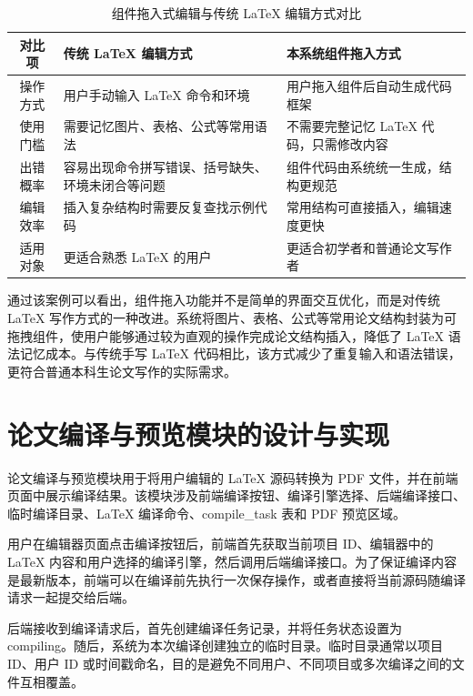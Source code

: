 \documentclass{xduugthesis}
\begin{document}
\begin{table}[!ht]
    \centering
    \caption{组件拖入式编辑与传统 LaTeX 编辑方式对比}
    \label{tab:drag-compare}
    \begin{tabular}{|c|p{5cm}|p{5cm}|}
        \hline
        对比项 & 传统 LaTeX 编辑方式 & 本系统组件拖入方式 \\
        \hline
        操作方式 & 用户手动输入 LaTeX 命令和环境 & 用户拖入组件后自动生成代码框架 \\
        \hline
        使用门槛 & 需要记忆图片、表格、公式等常用语法 & 不需要完整记忆 LaTeX 代码，只需修改内容 \\
        \hline
        出错概率 & 容易出现命令拼写错误、括号缺失、环境未闭合等问题 & 组件代码由系统统一生成，结构更规范 \\
        \hline
        编辑效率 & 插入复杂结构时需要反复查找示例代码 & 常用结构可直接插入，编辑速度更快 \\
        \hline
        适用对象 & 更适合熟悉 LaTeX 的用户 & 更适合初学者和普通论文写作者 \\
        \hline
    \end{tabular}
\end{table}

通过该案例可以看出，组件拖入功能并不是简单的界面交互优化，而是对传统 LaTeX 写作方式的一种改进。系统将图片、表格、公式等常用论文结构封装为可拖拽组件，使用户能够通过较为直观的操作完成论文结构插入，降低了 LaTeX 语法记忆成本。与传统手写 LaTeX 代码相比，该方式减少了重复输入和语法错误，更符合普通本科生论文写作的实际需求。

\section{论文编译与预览模块的设计与实现}
论文编译与预览模块用于将用户编辑的 LaTeX 源码转换为 PDF 文件，并在前端页面中展示编译结果\cite{wang2012latexaspnet}。该模块涉及前端编译按钮、编译引擎选择、后端编译接口、临时编译目录、LaTeX 编译命令、compile\_task 表和 PDF 预览区域。

用户在编辑器页面点击编译按钮后，前端首先获取当前项目 ID、编辑器中的 LaTeX 内容和用户选择的编译引擎，然后调用后端编译接口。为了保证编译内容是最新版本，前端可以在编译前先执行一次保存操作，或者直接将当前源码随编译请求一起提交给后端。

后端接收到编译请求后，首先创建编译任务记录，并将任务状态设置为 compiling。随后，系统为本次编译创建独立的临时目录。临时目录通常以项目 ID、用户 ID 或时间戳命名，目的是避免不同用户、不同项目或多次编译之间的文件互相覆盖。
\end{document}
